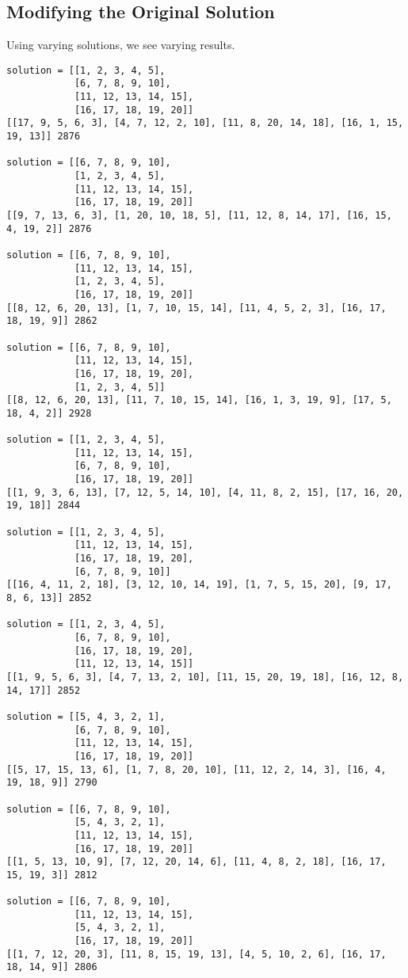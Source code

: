 \documentclass[12pt]{article}
\begin{document}
\subsection*{Modifying the Original Solution}
Using varying solutions, we see varying results.
\begin{lstlisting}[breaklines=true]
solution = [[1, 2, 3, 4, 5],
            [6, 7, 8, 9, 10],
            [11, 12, 13, 14, 15],
            [16, 17, 18, 19, 20]]
[[17, 9, 5, 6, 3], [4, 7, 12, 2, 10], [11, 8, 20, 14, 18], [16, 1, 15, 19, 13]] 2876

solution = [[6, 7, 8, 9, 10],
            [1, 2, 3, 4, 5],
            [11, 12, 13, 14, 15],
            [16, 17, 18, 19, 20]]
[[9, 7, 13, 6, 3], [1, 20, 10, 18, 5], [11, 12, 8, 14, 17], [16, 15, 4, 19, 2]] 2876

solution = [[6, 7, 8, 9, 10],
            [11, 12, 13, 14, 15],
            [1, 2, 3, 4, 5],
            [16, 17, 18, 19, 20]]
[[8, 12, 6, 20, 13], [1, 7, 10, 15, 14], [11, 4, 5, 2, 3], [16, 17, 18, 19, 9]] 2862

solution = [[6, 7, 8, 9, 10],
            [11, 12, 13, 14, 15],
            [16, 17, 18, 19, 20],
            [1, 2, 3, 4, 5]]
[[8, 12, 6, 20, 13], [11, 7, 10, 15, 14], [16, 1, 3, 19, 9], [17, 5, 18, 4, 2]] 2928

solution = [[1, 2, 3, 4, 5],
            [11, 12, 13, 14, 15],
            [6, 7, 8, 9, 10],
            [16, 17, 18, 19, 20]]
[[1, 9, 3, 6, 13], [7, 12, 5, 14, 10], [4, 11, 8, 2, 15], [17, 16, 20, 19, 18]] 2844

solution = [[1, 2, 3, 4, 5],
            [11, 12, 13, 14, 15],
            [16, 17, 18, 19, 20],
            [6, 7, 8, 9, 10]]
[[16, 4, 11, 2, 18], [3, 12, 10, 14, 19], [1, 7, 5, 15, 20], [9, 17, 8, 6, 13]] 2852

solution = [[1, 2, 3, 4, 5],
            [6, 7, 8, 9, 10],
            [16, 17, 18, 19, 20],
            [11, 12, 13, 14, 15]]
[[1, 9, 5, 6, 3], [4, 7, 13, 2, 10], [11, 15, 20, 19, 18], [16, 12, 8, 14, 17]] 2852

solution = [[5, 4, 3, 2, 1],
            [6, 7, 8, 9, 10],
            [11, 12, 13, 14, 15],
            [16, 17, 18, 19, 20]]
[[5, 17, 15, 13, 6], [1, 7, 8, 20, 10], [11, 12, 2, 14, 3], [16, 4, 19, 18, 9]] 2790

solution = [[6, 7, 8, 9, 10],
            [5, 4, 3, 2, 1],
            [11, 12, 13, 14, 15],
            [16, 17, 18, 19, 20]]
[[1, 5, 13, 10, 9], [7, 12, 20, 14, 6], [11, 4, 8, 2, 18], [16, 17, 15, 19, 3]] 2812

solution = [[6, 7, 8, 9, 10],
            [11, 12, 13, 14, 15],
            [5, 4, 3, 2, 1],
            [16, 17, 18, 19, 20]]
[[1, 7, 12, 20, 3], [11, 8, 15, 19, 13], [4, 5, 10, 2, 6], [16, 17, 18, 14, 9]] 2806
\end{lstlisting}
\end{document}
